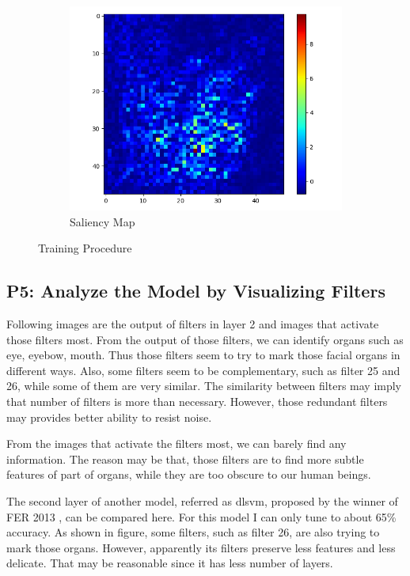 \documentclass[fleqn,a4paper,12pt]{article}
\begin{document}
\begin{figure}[H]
\begin{subfigure}{.33\textwidth}
  \includegraphics[width=\linewidth]{report-imgs/sa.png}
  \caption{Saliency Map}
  \label{fig:sub1}
\end{subfigure}%
\caption{Training Procedure}
\label{fig:test}
\end{figure}


\subsection*{P5: Analyze the Model by Visualizing Filters}

Following images are the output of filters in layer 2 and images that activate those filters most. From the output of those filters, we can identify organs such as eye, eyebow, mouth. Thus those filters seem to try to mark those facial organs in different ways. Also, some filters seem to be complementary, such as filter 25 and 26, while some of them are very similar. The similarity between filters may imply that number of filters is more than necessary. However, those redundant filters may provides better ability to resist noise.

From the images that activate the filters most, we can barely find any information. The reason may be that, those filters are to find more subtle features of part of organs, while they are too obscure to our human beings.

The second layer of another model, referred as dlsvm, proposed by the winner of FER 2013 \cite{dlsvm}, can be compared here. For this model I can only tune to about 65\% accuracy. As shown in figure, some filters, such as filter 26, are also trying to mark those organs. However, apparently its filters preserve less features and less delicate. That may be reasonable since it has less number of layers.
\end{document}
